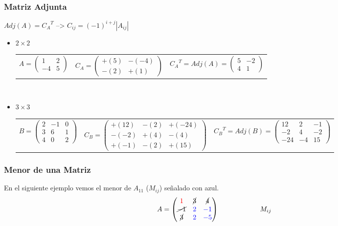 \documentclass[stu, 12pt, letterpaper, donotrepeattitle, floatsintext, natbib]{apa7}
\begin{document}
\subsubsection{Matriz Adjunta}
${Adj}(A)={C_A}^T$	\qquad \qquad \qquad -->	$C_{ij}=(-1)^{i+j} |A_{ij}|$
\begin{itemize}

\item $2 \times 2$ \\[0.5cm]
\begin{tabular}{ccc}
$A= \begin{pmatrix} 1 & 2 \\ -4 & 5 \end{pmatrix}$ \quad &
$C_A= \begin{pmatrix} +(5) & -(-4) \\ -(2) & +(1) \end{pmatrix}$ \quad &
${C_A}^T = {Adj}(A)=\begin{pmatrix} 5 & -2 \\ 4 & 1 \end{pmatrix}$
\end{tabular} \\[1cm]

\item $3 \times 3$ \\[0.5cm]
\begin{table}
\centering
\begin{tabular}{ccc}
$B= \begin{pmatrix} 
2 & -1 & 0 \\
3 & 6 & 1 \\
4 & 0 & 2
\end{pmatrix}$ \quad &
$C_B= \begin{pmatrix} 
+(12) & -(2) & +(-24) \\
-(-2) & +(4) & -(4) \\
+(-1) & -(2) & +(15) \end{pmatrix}$ \quad &
${C_B}^T = {Adj}(B)=\begin{pmatrix} 
12 & 2 & -1 \\
-2 & 4 & -2 \\
-24 & -4 & 15 \end{pmatrix}$
\end{tabular}
\end{table}
\end{itemize}

\subsubsection{Menor de una Matriz}
En el siguiente ejemplo vemos el menor de $A_{11}$ ($M_{ij}$) señalado con azul.
$$A=\begin{pmatrix}
\color{red}1 &  \cancel{3} & \cancel{4} \\
\cancel{-1} & \color{blue}2 & \color{blue}-1 \\
\cancel{3} & \color{blue}2 & \color{blue}-5
\end{pmatrix} 	\qquad \qquad \qquad	M_{ij}$$
\end{document}
